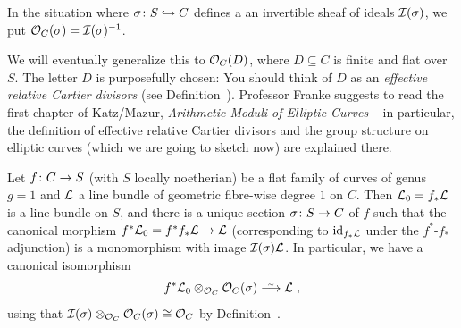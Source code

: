 \documentclass[a4paper,parskip=half,numbers=enddot, DIV=12]{scrreprt}
\begin{document}
\begin{defi}
	In the situation where $\sigma\colon S\monomorphism C$ defines a an invertible sheaf of ideals $\mathcal{I}(\sigma)$, we put $\mathcal{O}_C(\sigma)=\mathcal{I}(\sigma)^{-1}$.
\end{defi}
\begin{rem}
	We will eventually generalize this to $\mathcal{O}_C(D)$, where $D\subseteq C$ is finite and flat over $S$. The letter $D$ is purposefully chosen: You should think of $D$ as an \emph{effective relative Cartier divisors} (see Definition~). Professor Franke suggests to read the first chapter of Katz/Mazur, \emph{Arithmetic Moduli of Elliptic Curves} \cite{katzmazur} -- in particular, the definition of effective relative Cartier divisors and the group structure on elliptic curves (which we are going to sketch now) are explained there.
\end{rem}
\begin{prop}
	Let $f\colon C\morphism S$ (with $S$ locally noetherian) be a flat family of curves of genus $g=1$ and $\mathcal{L}$ a line bundle of geometric fibre-wise degree $1$ on $C$. Then $\mathcal{L}_0=f_*\mathcal{L}$ is a line bundle on $S$, and there is a unique section $\sigma\colon S\morphism C$ of $f$ such that the canonical morphism $f^*\Ll_0=f^*f_*\Ll\morphism\Ll$ (corresponding to $\operatorname{id}_{f_*\mathcal{L}}$ under the $f^*$-$f_*$ adjunction) is a monomorphism with image $\mathcal{I}(\sigma)\mathcal{L}$. In particular, we have a canonical isomorphism
	\begin{align*}
		f^*\Ll_0\otimes_{\Oo_C}\Oo_C(\sigma)\isomorphism\Ll\;,
	\end{align*}
	using that $\mathcal{I}(\sigma)\otimes_{\mathcal{O}_C}\mathcal{O}_C(\sigma)\cong \mathcal{O}_C$ by Definition~.
\end{prop}
\end{document}

